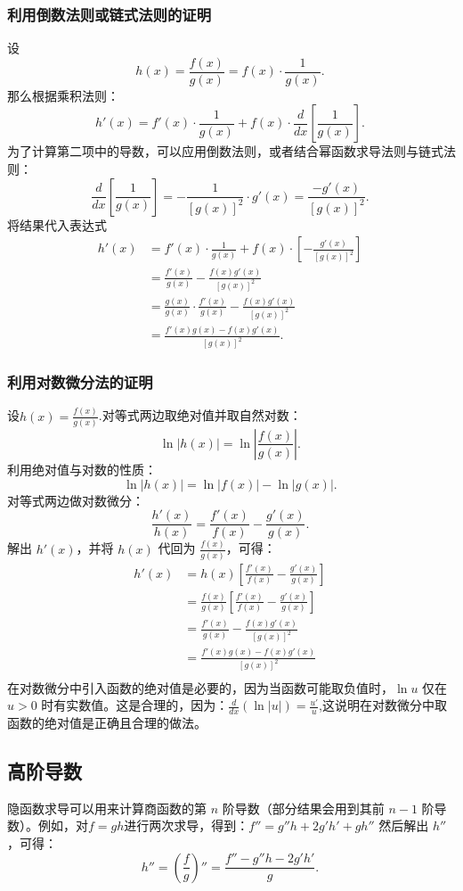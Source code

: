 \subsubsection{利用倒数法则或链式法则的证明}
设
$$
h(x) = \frac{f(x)}{g(x)} = f(x) \cdot \frac{1}{g(x)}.~
$$
那么根据乘积法则：
$$
h'(x) = f'(x)\cdot \frac{1}{g(x)} + f(x)\cdot \frac{d}{dx}\left[\frac{1}{g(x)}\right].~
$$
为了计算第二项中的导数，可以应用倒数法则，或者结合幂函数求导法则与链式法则：
$$
\frac{d}{dx}\left[\frac{1}{g(x)}\right] = -\frac{1}{[g(x)]^2}\cdot g'(x) = \frac{-g'(x)}{[g(x)]^2}.~
$$
将结果代入表达式
$$
\begin{aligned}
h'(x) &= f'(x)\cdot \frac{1}{g(x)} + f(x)\cdot \left[-\frac{g'(x)}{[g(x)]^2}\right]\\
&= \frac{f'(x)}{g(x)} - \frac{f(x)g'(x)}{[g(x)]^2}\\
&= \frac{g(x)}{g(x)} \cdot \frac{f'(x)}{g(x)} - \frac{f(x)g'(x)}{[g(x)]^2}\\
&= \frac{f'(x)g(x) - f(x)g'(x)}{[g(x)]^2}.
\end{aligned}~
$$
\subsubsection{利用对数微分法的证明}
设$h(x) = \frac{f(x)}{g(x)}$.对等式两边取绝对值并取自然对数：
$$
\ln |h(x)| = \ln \left|\frac{f(x)}{g(x)}\right|.~
$$
利用绝对值与对数的性质：
$$
\ln |h(x)| = \ln |f(x)| - \ln |g(x)|.~
$$
对等式两边做对数微分：
$$
\frac{h'(x)}{h(x)} = \frac{f'(x)}{f(x)} - \frac{g'(x)}{g(x)}.~
$$
解出 $h'(x)$，并将 $h(x)$ 代回为 $\tfrac{f(x)}{g(x)}$，可得：
$$
\begin{aligned}
h'(x) &= h(x)\left[\frac{f'(x)}{f(x)} - \frac{g'(x)}{g(x)}\right]\\
&= \frac{f(x)}{g(x)}\left[\frac{f'(x)}{f(x)} - \frac{g'(x)}{g(x)}\right]\\
&= \frac{f'(x)}{g(x)} - \frac{f(x)g'(x)}{[g(x)]^2}\\
&= \frac{f'(x)g(x) - f(x)g'(x)}{[g(x)]^2}\\
\end{aligned}~
$$
在对数微分中引入函数的绝对值是必要的，因为当函数可能取负值时，$\ln u$ 仅在 $u>0$ 时有实数值。这是合理的，因为：$\frac{d}{dx}(\ln |u|) = \frac{u'}{u}$,这说明在对数微分中取函数的绝对值是正确且合理的做法。
\subsection{高阶导数}
隐函数求导可以用来计算商函数的第 $n$ 阶导数（部分结果会用到其前 $n-1$ 阶导数）。例如，对$f = g h$进行两次求导，得到：$f'' = g''h + 2g'h' + gh''$
然后解出 $h''$，可得：
$$
h'' = \left(\frac{f}{g}\right)'' = \frac{f'' - g''h - 2g'h'}{g}.~
$$
